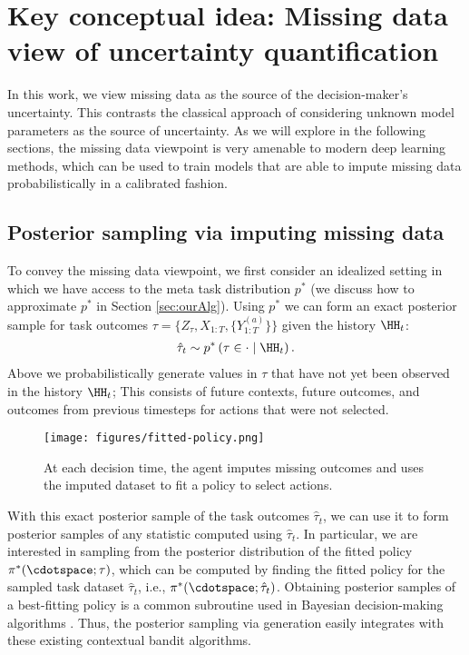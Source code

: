\section{Key conceptual idea: Missing data view of uncertainty quantification}
In this work, we view missing data as the source of the decision-maker's uncertainty.
This contrasts the classical approach of considering unknown model parameters as the source of uncertainty. As we will explore in the following sections, the missing data viewpoint is very amenable to modern deep learning methods, which can be used to train models that are able to impute missing data probabilistically in a calibrated fashion. 

\subsection{Posterior sampling via imputing missing data} 
To convey the missing data viewpoint, we first consider an idealized setting in which we have access to the meta task distribution $p^*$ (we discuss how to approximate $p^*$ in Section \ref{sec:ourAlg}). Using $p^*$ we can form an exact posterior sample for task outcomes $\tau = \big\{ Z_{\tau}, X_{1:T}, \{Y_{1:T}^{(a)}\} \big\}$ given the history $\HH_t$:
\begin{align}
    \label{eqn:taskPosteriorSample}
    \hat{\tau}_t \sim p^* \left( \tau \in \cdot \mid \HH_t \right).
\end{align}
Above we probabilistically generate values in $\tau$ that have not yet been observed in the history $\HH_t$; This consists of future contexts, future outcomes, and outcomes from previous timesteps for actions that were not selected.

\begin{figure}[h]
    \centering
    \texttt{[image: figures/fitted-policy.png]}
    \caption{At each decision time, the agent imputes missing outcomes and uses the imputed dataset to fit a policy to select actions.}
    \label{fig:fitted-policy}
\end{figure}

With this exact posterior sample of the task outcomes $\hat{\tau}_t$, we can use it to form posterior samples of any statistic computed using $\hat{\tau}_t$. 
In particular, we are interested in sampling from the posterior distribution of the fitted policy $\pi^*(\cdotspace; \tau)$, which can be computed by finding the fitted policy for the sampled task dataset $\hat{\tau}_t$, i.e., $\pi^*(\cdotspace; \hat{\tau}_t)$. 
Obtaining posterior samples of a best-fitting policy is a common subroutine used in Bayesian decision-making algorithms \cite{kaufmann2012bayesian, russo2018learning, ryzhov2012knowledge}. Thus, the posterior sampling via generation easily integrates with these existing contextual bandit algorithms. 


